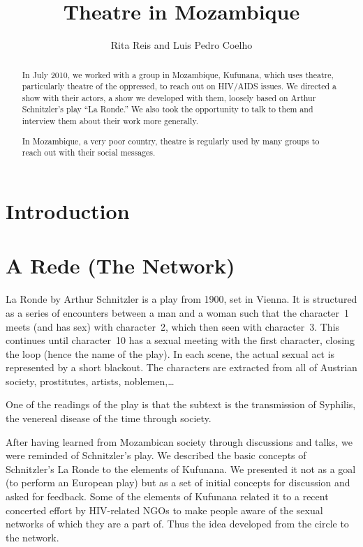 \documentclass[article,twocolumn,twoside]{memoir}
\title{Theatre in Mozambique}
\author{Rita Reis and Luis Pedro Coelho}
\begin{document}
\maketitle

\begin{abstract}
In July 2010, we worked with a group in Mozambique, Kufunana, which uses
theatre, particularly theatre of the oppressed, to reach out on HIV/AIDS
issues. We directed a show with their actors, a show we developed with them,
loosely based on Arthur Schnitzler's play ``La Ronde.'' We also took the
opportunity to talk to them and interview them about their work more generally.

In Mozambique, a very poor country, theatre is regularly used by many groups to
reach out with their social messages.

\end{abstract}

\chapter{Introduction}

\chapter{A Rede (The Network)}
La Ronde by Arthur Schnitzler is a play from 1900, set in Vienna. It is
structured as a series of encounters between a man and a woman such that the
character~1 meets (and has sex) with character~2, which then seen with
character~3. This continues until character~10 has a sexual meeting with the
first character, closing the loop (hence the name of the play). In each scene,
the actual sexual act is represented by a short blackout. The characters are
extracted from all of Austrian society, prostitutes, artists, noblemen,\ldots

One of the readings of the play is that the subtext is the transmission of
Syphilis, the venereal disease of the time through society.

After having learned from Mozambican society through discussions and talks, we
were reminded of Schnitzler's play. We described the basic concepts of
Schnitzler's La Ronde to the elements of Kufunana. We presented it not as a
goal (to perform an European play) but as a set of initial concepts for
discussion and asked for feedback. Some of the elements of Kufunana related it
to a recent concerted effort by HIV-related NGOs to make people aware of the
sexual networks of which they are a part of. Thus the idea developed from the
circle to the network.
\end{document}
